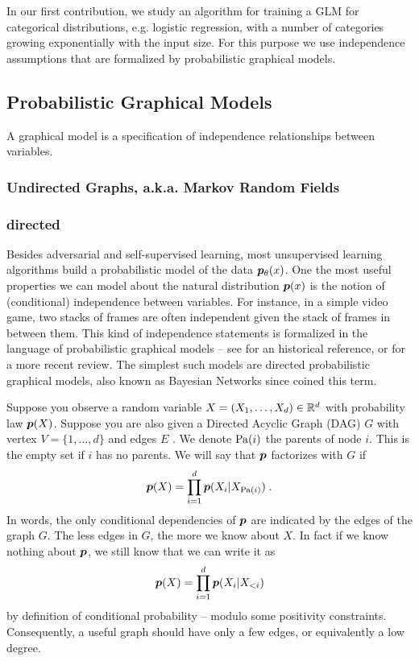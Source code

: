 In our first contribution, we study an algorithm for training a GLM for categorical distributions, e.g. logistic regression, with a number of categories growing exponentially with the input size.
For this purpose we use independence assumptions that are formalized by probabilistic graphical models. 

\subsection{Probabilistic Graphical Models}
\label{ssec:PGM}
A graphical model is a specification of independence relationships between variables. 


\subsubsection{Undirected Graphs, a.k.a. Markov Random Fields}



\subsubsection{directed} 
Besides adversarial and self-supervised learning, most unsupervised learning algorithms build a probabilistic model of the data $\bm{p}_{\theta}(x)$.
One the most useful properties we can model about the natural distribution $\bm{p}(x)$ is the notion of (conditional) independence between variables. For instance, in a simple video game, two stacks of frames are often independent given the stack of frames in between them. This kind of independence statements is formalized in the language of probabilistic graphical models -- see \citet{pearl1988probabilistic} for an historical reference, or  \citet{koller2009probabilistic} for a more recent review. The simplest such models are directed probabilistic graphical models, also known as Bayesian Networks since \citet{pearl1985bayesian} coined this term.

Suppose you observe a random variable $X=(X_1, \dots, X_d) \in \mathbb{R}^d$ with probability law $\bm{p}(X)$. Suppose you are also given a Directed Acyclic Graph (DAG) $G$ with vertex $V=\{1, \dots, d \}$ and edges $E$ . We denote $\operatorname{\mathrm{Pa}}(i)$ the parents of node $i$. This is the empty set if $i$ has no parents. We will say that $\bm{p}$ factorizes with $G$ if
\begin{align}
    \bm{p}(X) = \prod_{i=1}^d \bm{p}(X_i | X_{\operatorname{\mathrm{Pa}}(i)}) \; .
\end{align}
In words, the only conditional dependencies of $\bm{p}$ are indicated by the edges of the graph $G$. The less edges in $G$, the more we know about $X$. In fact if we know nothing about $\bm{p}$, we still know that we can write it as 
\begin{align}
    \bm{p}(X) = \prod_{i=1}^d \bm{p}(X_i | X_{<i} )\textbf{}
\end{align}
by definition of conditional probability -- modulo some positivity constraints. Consequently, a useful graph should have only a few edges, or equivalently a low degree.

